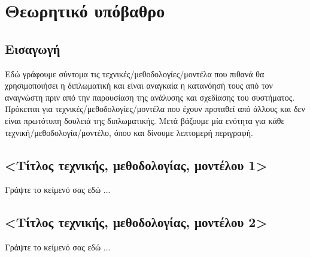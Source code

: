 \chapter{Θεωρητικό υπόβαθρο}
\label{chap3}

\section{Εισαγωγή}
Εδώ γράφουμε σύντομα τις τεχνικές/μεθοδολογίες/μοντέλα που πιθανά θα χρησιμοποιήσει η διπλωματική και είναι αναγκαία η κατανόησή τους από τον αναγνώστη πριν από την παρουσίαση της ανάλυσης και σχεδίασης του συστήματος. 
Πρόκειται για τεχνικές/μεθοδολογίες/μοντέλα που έχουν προταθεί από άλλους και δεν είναι πρωτότυπη δουλειά της διπλωματικής. 
Μετά βάζουμε μία ενότητα για κάθε τεχνική/μεθοδολογία/μοντέλο, όπου και δίνουμε λεπτομερή περιγραφή.

\section{<Τίτλος τεχνικής, μεθοδολογίας, μοντέλου 1>}
Γράψτε το κείμενό σας εδώ ...

\section{<Τίτλος τεχνικής, μεθοδολογίας, μοντέλου 2>}
Γράψτε το κείμενό σας εδώ ...